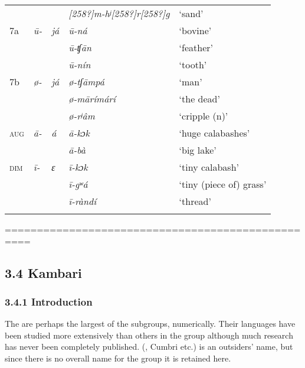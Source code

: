 \documentclass[output=paper]{langsci/langscibook}
\begin{document}
\begin{tabularx}{\textwidth}{XXXXX}
&  &  & \textit{[258?]m-hʲ[258?]r[258?]g} & {‘sand’}\\
{7a} & \textit{\=u-} & \textit{já} & \textit{ū-ná} & {‘bovine’}\\
&  &  & \textit{ū-ʧān} & {‘feather’}\\
&  &  & \textit{ū-nín} & {‘tooth’}\\
{7b} & \textit{ø-} & \textit{já} & \textit{ø-tʃāmpá}  & {‘man’}\\
&  &  & \textit{ø-mārímárí} & {‘the dead’}\\
&  &  & \textit{ø-rʲâm} & {‘cripple (n)’}\\
{\textsc{aug}} & \textit{ā-} & \textit{á} & \textit{ā-kɔk} & {‘huge calabashes’}\\
&  &  & \textit{ā-bà} & {‘big lake’}\\
{\textsc{dim}} & \textit{ī-} & \textit{ɛ} & \textit{ī-kɔk} & {‘tiny calabash’}\\
&  &  & \textit{ī-gʷá} & {‘tiny (piece of) grass’}\\
&  &  & \textit{ī-ràndí} & {‘thread’}\\
\lspbottomrule
\end{tabularx}
==================================================

\subsection{{3.4 Kambari}}
\subsubsection{3.4.1 Introduction}

The  are perhaps the largest of the  subgroups, numerically. Their languages have been studied more extensively than others in the group although much research has never been completely published.  (, Cumbri etc.) is an outsiders’ name, but since there is no overall name for the group it is retained here.  
\end{document}
